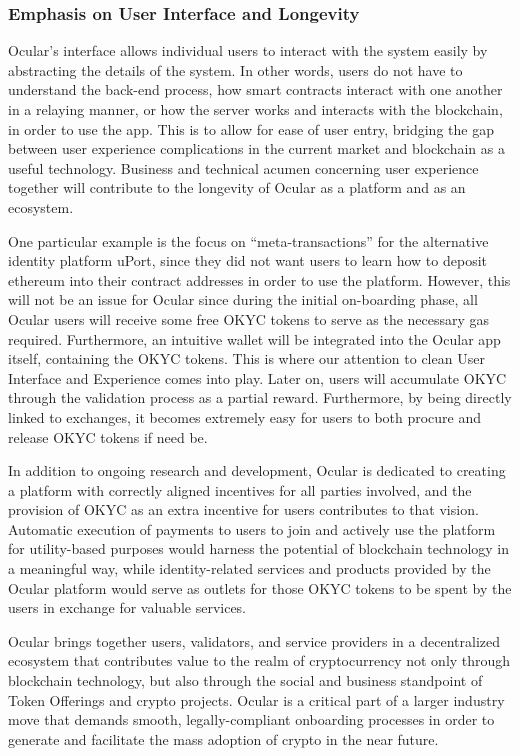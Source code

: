 \documentclass[12pt]{article}
\begin{document}
\subsubsection*{Emphasis on User Interface and Longevity}
Ocular's interface allows individual users to interact with the system easily by abstracting the details of the system. In other words, users do not have to understand the back-end process, how smart contracts interact with one another in a relaying manner, or how the server works and interacts with the blockchain, in order to use the app. This is to allow for ease of user entry, bridging the gap between user experience complications in the current market and blockchain as a useful technology. Business and technical acumen concerning user experience together will contribute to the longevity of Ocular as a platform and as an ecosystem.

One particular example is the focus on ``meta-transactions'' for the alternative identity platform uPort, since they did not want users to learn how to deposit ethereum into their contract addresses in order to use the platform. However, this will not be an issue for Ocular since during the initial on-boarding phase, all Ocular users will receive some free OKYC tokens to serve as the necessary gas required. Furthermore, an intuitive wallet will be integrated into the Ocular app itself, containing the OKYC tokens. This is where our attention to clean User Interface and Experience comes into play. Later on, users will accumulate OKYC through the validation process as a partial reward. Furthermore, by being directly linked to exchanges, it becomes extremely easy for users to both procure and release OKYC tokens if need be. 

In addition to ongoing research and development, Ocular is dedicated to creating a platform with correctly aligned incentives for all parties involved, and the provision of OKYC as an extra incentive for users contributes to that vision. Automatic execution of payments to users to join and actively use the platform for utility-based purposes would harness the potential of blockchain technology in a meaningful way, while identity-related services and products provided by the Ocular platform would serve as outlets for those OKYC tokens to be spent by the users in exchange for valuable services. 

Ocular brings together users, validators, and service providers in a decentralized ecosystem that contributes value to the realm of cryptocurrency not only through blockchain technology, but also through the social and business standpoint of Token Offerings and crypto projects. Ocular is a critical part of a larger industry move that demands smooth, legally-compliant onboarding processes in order to generate and facilitate the mass adoption of crypto in the near future.
\end{document}
